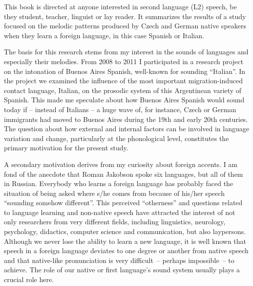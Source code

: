 
This book is directed at anyone interested in second language (L2) speech, be they student, teacher, linguist or lay reader. It summarizes the results of a study focused on the melodic patterns produced by Czech and German native speakers when they learn a foreign language, in this case Spanish or Italian.



The basis for this research stems from my interest in the sounds of languages and especially their melodies. From 2008 to 2011 I participated in a research project on the intonation of Buenos Aires Spanish, well-known for sounding “Italian”. In the project we examined the influence of the most important migration-induced contact language, Italian, on the prosodic system of this Argentinean variety of Spanish. This made me speculate about how Buenos Aires Spanish would sound today if -- instead of Italians -- a huge wave of, for instance, Czech or German immigrants had moved to Buenos Aires during the 19th and early 20th centuries. The question about how external and internal factors can be involved in language variation and change, particularly at the phonological level, constitutes the primary motivation for the present study.



A secondary motivation derives from my curiosity about foreign accents. I am fond of the anecdote that Roman Jakobson spoke six languages, but all of them in Russian. Everybody who learns a foreign language has probably faced the situation of being asked where s/he comes from because of his/her speech “sounding somehow different”. This perceived “otherness” and questions related to language learning and non-native speech have attracted the interest of not only researchers from very different fields, including linguistics, neurology, psychology, didactics, computer science and communication, but also laypersons. Although we never lose the ability to learn a new language, it is well known that speech in a foreign language deviates to one degree or another from native speech and that native-like pronunciation is very difficult~-- perhaps impossible~-- to achieve. The role of our native or first language’s sound system usually plays a crucial role here.



